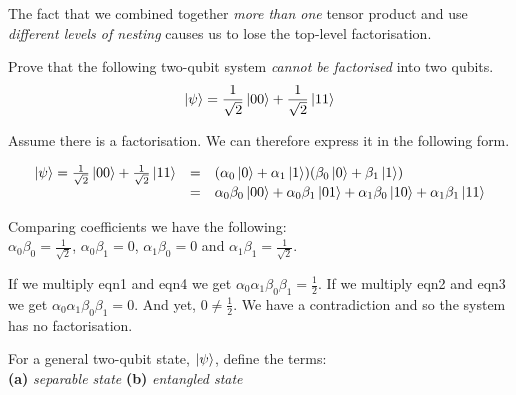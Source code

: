 
\frmrule

The fact that we combined together \textit{more than one} tensor product 
and use \textit{different levels of nesting} causes us to lose the 
top-level factorisation. 


\begin{example}
Prove that the following two-qubit system \textit{cannot be factorised}
into two qubits. 
$$\left|\psi\right\rangle = \frac{1}{\sqrt{2}} \left|00\right\rangle + \frac{1}{\sqrt{2}} \left|11\right\rangle$$
\end{example}

\frmrule

Assume there is a factorisation. We can therefore express it in the following form. 

\[ \begin{array}{lll}
\left|\psi\right\rangle = \frac{1}{\sqrt{2}} \left|00\right\rangle + \frac{1}{\sqrt{2}} \left|11\right\rangle 
& = & (\alpha_0 \left|0\right\rangle + \alpha_1 \left|1\right\rangle)(\beta_0 \left|0\right\rangle + \beta_1 \left|1\right\rangle) \\
& = & \alpha_0 \beta_0 \left|00\right\rangle + 
\alpha_0 \beta_1 \left|01\right\rangle + 
\alpha_1 \beta_0 \left|10\right\rangle + 
\alpha_1 \beta_1 \left|11\right\rangle \\
\end{array}\] 

Comparing coefficients we have the following: \\
$\alpha_0 \beta_0 = \frac{1}{\sqrt{2}}$,
$\alpha_0 \beta_1 = 0$,
$\alpha_1 \beta_0 = 0$ and
$\alpha_1 \beta_1 = \frac{1}{\sqrt{2}}$.

If we multiply eqn1 and eqn4 we get $\alpha_0 \alpha_1 \beta_0 \beta_1 = \frac{1}{2}$.
If we multiply eqn2 and eqn3 we get $\alpha_0 \alpha_1 \beta_0 \beta_1 = 0$.
And yet, $0 \neq \frac{1}{2}$. We have a contradiction and so the system has no factorisation. 

\frmrule

\begin{example}
For a general two-qubit state, $\left|\psi\right\rangle$, define the terms: \\
\textbf{(a)} \textit{separable state}
\textbf{(b)} \textit{entangled state}
\end{example}



